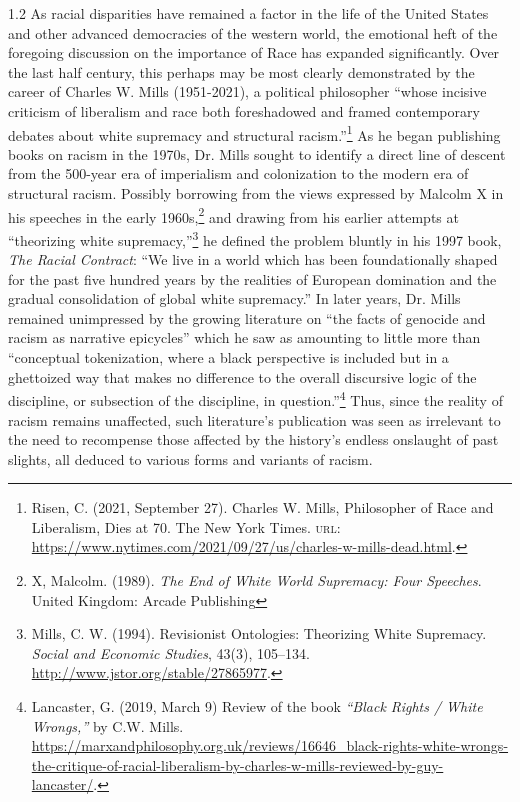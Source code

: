 \documentclass[../unravbook.tex]{subfiles}
\begin{document}
\begin{spacing}{1.2}
As racial disparities have remained a factor in the life of the United States and other advanced democracies of the western world, the emotional heft of the foregoing discussion on the importance of Race has expanded significantly. Over the last half century, this perhaps may be most clearly demonstrated by the career of Charles W. Mills (1951-2021), a political philosopher ``whose incisive criticism of liberalism and race both foreshadowed and framed contemporary debates about white supremacy and structural racism.''\footnote{Risen, C. (2021, September 27). Charles W. Mills, Philosopher of Race and Liberalism, Dies at 70. The New York Times. \textsc{url: } \url{https://www.nytimes.com/2021/09/27/us/charles-w-mills-dead.html}.}  As he began publishing books on racism in the 1970s, Dr. Mills sought to identify a direct line of descent from the 500-year era of imperialism and colonization to the modern era of structural racism. Possibly borrowing from the views expressed by Malcolm X in his speeches in the early 1960s,\footnote{X, Malcolm. (1989). \textit{The End of White World Supremacy: Four Speeches}. United Kingdom: Arcade Publishing} and drawing from his earlier attempts at ``theorizing white supremacy,''\footnote{Mills, C. W. (1994). Revisionist Ontologies: Theorizing White Supremacy. \textit{Social and Economic Studies}, 43(3), 105--134. \url{http://www.jstor.org/stable/27865977}.} he defined the problem bluntly in his 1997 book, \textit{The Racial Contract}: ``We live in a world which has been foundationally shaped for the past five hundred years by the realities of European domination and the gradual consolidation of global white supremacy.'' In later years, Dr. Mills remained unimpressed by the growing literature on ``the facts of genocide and racism as narrative epicycles'' which he saw as amounting to little more than ``conceptual tokenization, where a black perspective is included but in a ghettoized way that makes no difference to the overall discursive logic of the discipline, or subsection of the discipline, in question.''\footnote{Lancaster, G. (2019, March 9) Review of the book \textit{``Black Rights / White Wrongs,''} by C.W. Mills. \url{https://marxandphilosophy.org.uk/reviews/16646_black-rights-white-wrongs-the-critique-of-racial-liberalism-by-charles-w-mills-reviewed-by-guy-lancaster/}.} Thus, since the reality of racism remains unaffected, such literature's publication was seen as irrelevant to the need to recompense those affected by the history's endless onslaught of past slights, all deduced to various forms and variants of racism.


\end{spacing}
\end{document}
